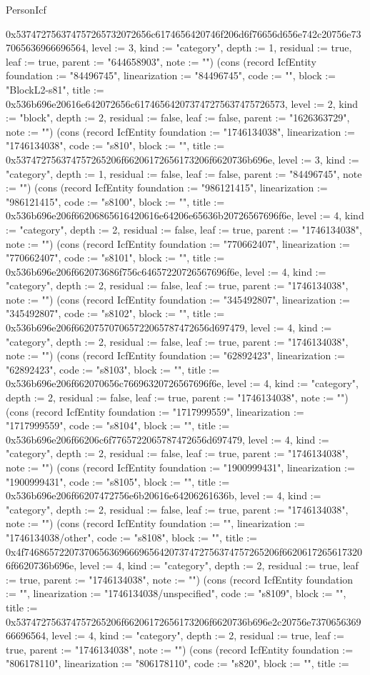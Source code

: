 \begin{lexlean}{PersonIcf}
\begin{semanticmodule}
{0x537472756374757265732072656c6174656420746f206d6f76656d656e742c20756e737065636966696564, level := 3, kind := "category", depth := 1, residual := true, leaf := true, parent := "644658903", note := ""}) (cons (record IcfEntity {foundation := "84496745", linearization := "84496745", code := "", block := "BlockL2-s81", title := 0x536b696e20616e642072656c617465642073747275637475726573, level := 2, kind := "block", depth := 2, residual := false, leaf := false, parent := "1626363729", note := ""}) (cons (record IcfEntity {foundation := "1746134038", linearization := "1746134038", code := "s810", block := "", title := 0x537472756374757265206f66206172656173206f6620736b696e, level := 3, kind := "category", depth := 1, residual := false, leaf := false, parent := "84496745", note := ""}) (cons (record IcfEntity {foundation := "986121415", linearization := "986121415", code := "s8100", block := "", title := 0x536b696e206f66206865616420616e64206e65636b20726567696f6e, level := 4, kind := "category", depth := 2, residual := false, leaf := true, parent := "1746134038", note := ""}) (cons (record IcfEntity {foundation := "770662407", linearization := "770662407", code := "s8101", block := "", title := 0x536b696e206f662073686f756c64657220726567696f6e, level := 4, kind := "category", depth := 2, residual := false, leaf := true, parent := "1746134038", note := ""}) (cons (record IcfEntity {foundation := "345492807", linearization := "345492807", code := "s8102", block := "", title := 0x536b696e206f662075707065722065787472656d697479, level := 4, kind := "category", depth := 2, residual := false, leaf := true, parent := "1746134038", note := ""}) (cons (record IcfEntity {foundation := "62892423", linearization := "62892423", code := "s8103", block := "", title := 0x536b696e206f662070656c76696320726567696f6e, level := 4, kind := "category", depth := 2, residual := false, leaf := true, parent := "1746134038", note := ""}) (cons (record IcfEntity {foundation := "1717999559", linearization := "1717999559", code := "s8104", block := "", title := 0x536b696e206f66206c6f7765722065787472656d697479, level := 4, kind := "category", depth := 2, residual := false, leaf := true, parent := "1746134038", note := ""}) (cons (record IcfEntity {foundation := "1900999431", linearization := "1900999431", code := "s8105", block := "", title := 0x536b696e206f66207472756e6b20616e64206261636b, level := 4, kind := "category", depth := 2, residual := false, leaf := true, parent := "1746134038", note := ""}) (cons (record IcfEntity {foundation := "", linearization := "1746134038/other", code := "s8108", block := "", title := 0x4f746865722073706563696669656420737472756374757265206f66206172656173206f6620736b696e, level := 4, kind := "category", depth := 2, residual := true, leaf := true, parent := "1746134038", note := ""}) (cons (record IcfEntity {foundation := "", linearization := "1746134038/unspecified", code := "s8109", block := "", title := 0x537472756374757265206f66206172656173206f6620736b696e2c20756e737065636966696564, level := 4, kind := "category", depth := 2, residual := true, leaf := true, parent := "1746134038", note := ""}) (cons (record IcfEntity {foundation := "806178110", linearization := "806178110", code := "s820", block := "", title := }
\end{semanticmodule}
\end{lexlean}
